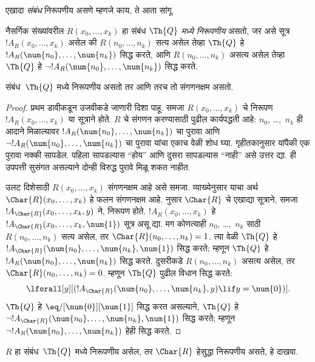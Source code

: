 \documentclass[../../../include/open-logic-section]{subfiles}
\begin{document}


एखादा \emph{संबंध} निरूपणीय असणे म्हणजे काय, ते आता सांगू.

\begin{defn}
 नैसर्गिक संख्यांवरील
$R(x_0,\dots,x_k)$ हा संबंध {\em $\Th{Q}$ मध्ये निरूपणीय}
असतो, जर असे सूत्र $!A_R(x_0,\dots,x_k)$ असेल की
$R(n_0,\dots,n_k)$ सत्य असेल तेव्हा $\Th{Q}$ हे
$!A_R(\num{n_0},\dots,\num{n_k})$ सिद्ध करते, आणि
$R(n_0,\dots,n_k)$ असत्य असेल तेव्हा $\Th{Q}$ हे
$\lnot !A_R(\num{n_0},
\dots, \num{n_k})$ सिद्ध करते.
\end{defn}

\begin{thm}
 संबंध~$\Th{Q}$ मध्ये निरूपणीय
असतो तर आणि तरच तो संगणनक्षम असतो.
\end{thm}

\begin{proof}
प्रथम डावीकडून उजवीकडे जाणारी दिशा पाहू. समजा
$R(x_0,\dots,x_k)$ चे निरूपण $!A_R(x_0,\dots,x_k)$ या
सूत्राने होते. $R$ चे संगणन करण्यासाठी पुढील कार्यपद्धती
आहे: $n_0$, \dots,~$n_k$ ही आदाने मिळाल्यावर
$!A_R(\num{n_0}, \dots, \num{n_k})$ चा पुरावा आणि
$\lnot !A_R(\num{n_0}, \dots, \num{n_k})$ चा पुरावा
यांचा एकाच वेळी शोध घ्या. गृहीतकानुसार यांपैकी एक पुरावा
नक्की सापडेल. पहिला सापडल्यास ``होय'' आणि दुसरा सापडल्यास
``नाही'' असे उत्तर द्या. ही उपपत्ती सुसंगत असल्याने दोन्ही
विरुद्ध पुरावे मिळू शकत नाहीत.

उलट दिशेसाठी $R(x_0, \dots, x_k)$ संगणनक्षम आहे असे समजा.
व्याख्येनुसार याचा अर्थ $\Char{R}(x_0, \dots, x_k)$ हे
फलन संगणनक्षम आहे.  नुसार
$\Char{R}$ चे एखाद्या सूत्राने, समजा
$!A_{\Char{R}}(x_0, \dots, x_k,
y)$ ने, निरूपण होते. $!A_R(x_0, \dots, x_k)$ हे
$!A_{\Char{R}}(x_0,
\dots, x_k, \num{1})$ सूत्र असू द्या. मग कोणत्याही
$n_0$, \dots,~$n_k$ साठी $R(n_0,
\dots, n_k)$ सत्य असेल, तर $\Char{R}(n_0, \dots, n_k) = 1$.
त्या वेळी $\Th{Q}$ हे
$!A_{\Char{R}}(\num{n_0}, \dots, \num{n_k},
\num{1})$ सिद्ध करते; म्हणून $\Th{Q}$ हे
$!A_R(\num{n_0}, \dots,
\num{n_k})$ सिद्ध करते. दुसरीकडे $R(n_0, \dots, n_k)$
असत्य असेल, तर $\Char{R}(n_0, \dots, n_k) = 0$.
म्हणून $\Th{Q}$ पुढील विधान सिद्ध करते:
\[
\lforall[y][(!A_{\Char{R}}(\num{n_0}, \dots, \num{n_k}, y) \lif y =
  \num{0})].
\]
$\Th{Q}$ हे $\eq/[\num{0}][\num{1}]$ सिद्ध करत असल्याने,
$\Th{Q}$ हे $\lnot !A_{\Char{R}}(\num{n_0}, \dots, \num{n_k}, \num{1})$
सिद्ध करते; म्हणून $\lnot !A_R(\num{n_0}, \dots, \num{n_k})$
हेही सिद्ध करते.
\end{proof}

\begin{prob}
$R$ हा संबंध~$\Th{Q}$ मध्ये निरूपणीय असेल, तर
$\Char{R}$ हेसुद्धा निरूपणीय असते, हे दाखवा.
\end{prob}
\end{document}
